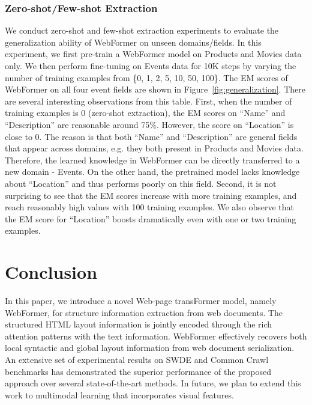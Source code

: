 \documentclass[sigconf]{acmart}
\begin{document}
\subsubsection{Zero-shot/Few-shot Extraction}
We conduct zero-shot and few-shot extraction experiments to evaluate the generalization ability of WebFormer on unseen domains/fields. In this experiment, we first pre-train a WebFormer model on Products and Movies data only. We then perform fine-tuning on Events data for 10K steps by varying the number of training examples from \{0, 1, 2, 5, 10, 50, 100\}. The EM scores of WebFormer on all four event fields are shown in Figure~\ref{fig:generalization}.
There are several interesting observations from this table. First, when the number of training examples is 0 (zero-shot extraction), the EM scores on ``Name'' and ``Description'' are reasonable around 75\%. However, the score on ``Location'' is close to 0. The reason is that both ``Name'' and ``Description'' are general fields that appear across domains, e.g. they both present in Products and Movies data. Therefore, the learned knowledge in WebFormer can be directly transferred to a new domain - Events. On the other hand, the pretrained model lacks knowledge about ``Location'' and thus performs poorly on this field. Second, it is not surprising to see that the EM scores increase with more training examples, and reach reasonably high values with 100 training examples. We also observe that the EM score for ``Location'' boosts dramatically even with one or two training examples.

\section{Conclusion}
In this paper, we introduce a novel Web-page transFormer model, namely WebFormer, for structure information extraction from web documents. The structured HTML layout information is jointly encoded through the rich attention patterns with the text information. WebFormer effectively recovers both local syntactic and global layout information from web document serialization.
An extensive set of experimental results on SWDE and Common Crawl benchmarks has demonstrated the superior performance of the proposed approach over several state-of-the-art methods. In future, we plan to extend this work to multimodal learning that incorporates visual features. %
\end{document}
